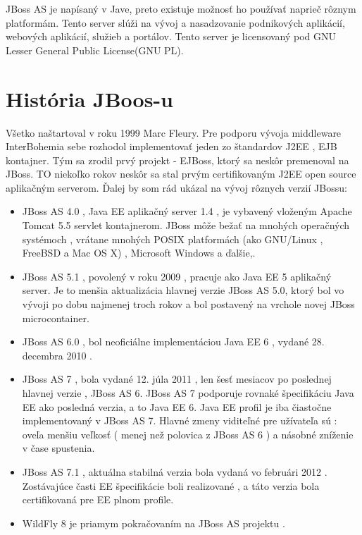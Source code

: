 JBoss AS je napísaný v Jave, preto existuje možnosť  ho používať naprieč rôznym platformám. Tento server slúži na vývoj a nasadzovanie podnikových aplikácií, webových aplikácií, služieb a portálov. Tento server je licensovaný pod GNU Lesser General Public License(GNU PL).

\section{História JBoos-u}
Všetko naštartoval v roku 1999 Marc Fleury. Pre podporu vývoja middleware InterBohemia sebe rozhodol implementovať jeden zo štandardov J2EE , EJB kontajner. Tým sa zrodil prvý projekt - EJBoss, ktorý sa neskôr premenoval na JBoss. TO niekoľko rokov neskôr sa stal prvým certifikovaným  J2EE  open source aplikačným serverom. Ďalej by som rád ukázal na vývoj rôznych verzií JBossu:\cite{jbossWeb}


\begin{itemize}
\item JBoss AS 4.0 , Java EE aplikačný server 1.4 , je vybavený vloženým Apache Tomcat 5.5 servlet kontajnerom. JBoss môže bežať na mnohých operačných systémoch , vrátane mnohých POSIX platformách (ako GNU/Linux , FreeBSD a Mac OS X) , Microsoft Windows a ďalšie,.
\item JBoss AS 5.1 , povolený v roku 2009 , pracuje ako Java EE 5 aplikačný server. Je to menšia aktualizácia hlavnej verzie JBoss AS 5.0, ktorý bol vo vývoji po dobu najmenej troch rokov a bol postavený na vrchole novej JBoss microcontainer.

\item JBoss AS 6.0 , bol neoficiálne implementáciou Java EE 6 , vydané 28. decembra 2010 .

\item JBoss AS 7 , bola vydané 12. júla 2011 , len šesť mesiacov po poslednej hlavnej verzie , JBoss AS 6. JBoss AS 7 podporuje rovnaké špecifikáciu Java EE ako posledná verzia, a to Java EE 6. Java EE profil je iba čiastočne implementovaný v JBoss AS 7. Hlavné zmeny viditeľné pre užívateľa sú : oveľa menšiu veľkosť ( menej než polovica z JBoss AS 6 ) a násobné zníženie v čase spustenia.

\item JBoss AS 7.1 , aktuálna stabilná verzia bola vydaná vo februári 2012 . Zostávajúce časti EE špecifikácie boli realizované , a táto verzia bola certifikovaná pre EE plnom profile.

\item WildFly 8 je priamym pokračovaním na JBoss AS projektu .

\end{itemize}

